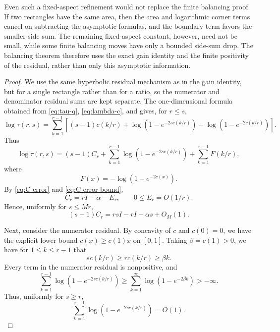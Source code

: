 \documentclass[11pt]{article}
\numberwithin{equation}{section}
\begin{document}
Even such a fixed-aspect refinement would not replace the finite balancing proof. If two rectangles have the same area, then the area and logarithmic corner terms cancel on subtracting the asymptotic formulas, and the boundary term favors the smaller side sum. The remaining fixed-aspect constant, however, need not be small, while some finite balancing moves have only a bounded side-sum drop. The balancing theorem therefore uses the exact gain identity and the finite positivity of the residual, rather than only this asymptotic information.

\begin{proof}
We use the same hyperbolic residual mechanism as in the gain identity, but for a single rectangle rather than for a ratio, so the numerator and denominator residual sums are kept separate.
The one-dimensional formula obtained from \eqref{eq:tau-q}, \eqref{eq:lambda-c}, and  gives, for $r\le s$,
\[
  \log\tau(r,s)
  =
  \sum_{k=1}^{r-1}
  \left[
  (s-1)c(k/r)
  +\log\left(1-e^{-2s c(k/r)}\right)
  -\log\left(1-e^{-2c(k/r)}\right)
  \right].
\]
Thus
\begin{equation}\label{eq:bounded-logtau-split}
  \log \tau(r,s)
  =
  (s-1)C_r
  +
  \sum_{k=1}^{r-1}\log\left(1-e^{-2s c(k/r)}\right)
  +
  \sum_{k=1}^{r-1}F(k/r),
\end{equation}
where
\[
  F(x)=-\log\left(1-e^{-2c(x)}\right).
\]
By \eqref{eq:C-error} and \eqref{eq:C-error-bound},
\[
  C_r=rI-\alpha-E_r,
  \qquad
  0\le E_r=O(1/r).
\]
Hence, uniformly for $s\le Mr$,
\begin{equation}\label{eq:bounded-main-term}
  (s-1)C_r
  =
  rsI-rI-\alpha s+O_M(1).
\end{equation}

Next, consider the numerator residual. By concavity of $c$ and $c(0)=0$, we have the explicit lower bound $c(x)\ge c(1)x$ on $[0,1]$. Taking $\beta=c(1)>0$, we have for $1\le k\le r-1$ that
\[
  sc(k/r)\ge rc(k/r)\ge\beta k.
\]
Every term in the numerator residual is nonpositive, and
\[
  \sum_{k=1}^{r-1}\log\left(1-e^{-2s c(k/r)}\right)
  \ge
  \sum_{k=1}^{\infty}\log\left(1-e^{-2\beta k}\right)
  >-\infty.
\]
Thus, uniformly for $s\ge r$,
\begin{equation}\label{eq:bounded-numerator-residual}
  \sum_{k=1}^{r-1}\log\left(1-e^{-2s c(k/r)}\right)=O(1).
\end{equation}


\end{proof}
\end{document}
